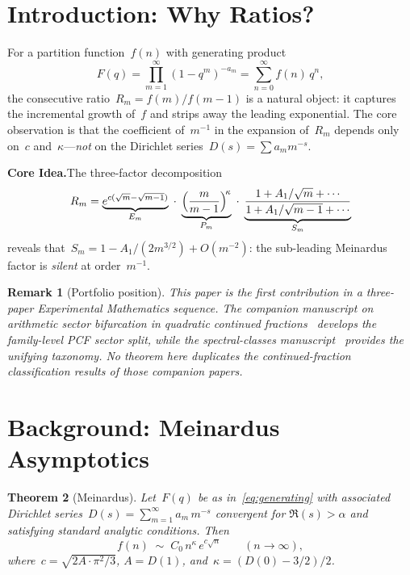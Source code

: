 \documentclass[11pt,a4paper]{article}
\newtheorem{theorem}{Theorem}[section]
\newtheorem{remark}[theorem]{Remark}
\begin{document}
\tableofcontents

\section{Introduction: Why Ratios?}\label{sec:intro}

For a partition function~$f(n)$ with generating product
\begin{equation}\label{eq:generating}
  F(q) = \prod_{m=1}^{\infty}(1-q^m)^{-a_m} = \sum_{n=0}^{\infty} f(n)\,q^n,
\end{equation}
the consecutive ratio~$R_m = f(m)/f(m-1)$ is a natural object: it captures the incremental growth of~$f$ and strips away the leading exponential. The core observation is that the coefficient of~$m^{-1}$ in the expansion of~$R_m$ depends only on~$c$ and~$\kappa$---\emph{not} on the Dirichlet series~$D(s) = \sum a_m m^{-s}$.

\medskip
\noindent\textbf{Core Idea.}\quad The three-factor decomposition
\[
  R_m = \underbrace{e^{c(\sqrt{m}-\sqrt{m-1})}}_{E_m}\;\cdot\;
        \underbrace{\Bigl(\frac{m}{m-1}\Bigr)^{\!\kappa}}_{P_m}\;\cdot\;
        \underbrace{\frac{1 + A_1/\sqrt{m} + \cdots}{1 + A_1/\sqrt{m-1} + \cdots}}_{S_m}
\]
reveals that~$S_m = 1 - A_1/(2m^{3/2}) + O(m^{-2})$: the sub-leading Meinardus factor is \emph{silent} at order~$m^{-1}$.

\begin{remark}[Portfolio position]
This paper is the first contribution in a three-paper Experimental Mathematics sequence. The companion manuscript on arithmetic sector bifurcation in quadratic continued fractions~\cite{pcf_bifurcation_2026} develops the family-level PCF sector split, while the spectral-classes manuscript~\cite{pcf_spectral_2026} provides the unifying taxonomy. No theorem here duplicates the continued-fraction classification results of those companion papers.
\end{remark}

\section{Background: Meinardus Asymptotics}\label{sec:background}

\begin{theorem}[Meinardus]\label{thm:meinardus}
Let~$F(q)$ be as in~\eqref{eq:generating} with associated Dirichlet series~$D(s) = \sum_{m=1}^\infty a_m\,m^{-s}$ convergent for $\Re(s) > \alpha$ and satisfying standard analytic conditions. Then
\begin{equation}\label{eq:meinardus}
  f(n) \;\sim\; C_0\,n^{\kappa}\,e^{c\sqrt{n}} \qquad (n \to \infty),
\end{equation}
where~$c = \sqrt{2A \cdot \pi^2/3}$, $A = D(1)$, and~$\kappa = (D(0) - 3/2)/2$.
\end{theorem}
\end{document}
